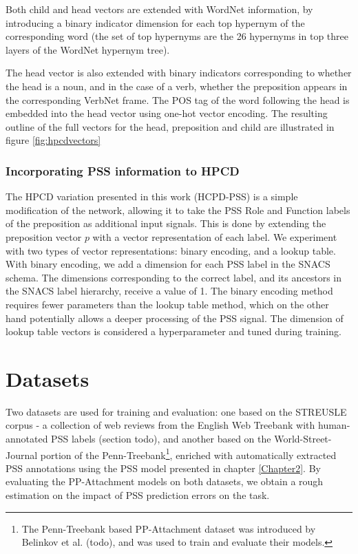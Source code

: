 Both child and head vectors are extended with WordNet information, by introducing a binary indicator dimension for each top hypernym of the corresponding word (the set of top hypernyms are the 26 hypernyms in top three layers of the WordNet hypernym tree). 

The head vector is also extended with binary indicators corresponding to whether the head is a noun, and in the case of a verb, whether the preposition appears in the corresponding VerbNet frame. The POS tag of the word following the head is embedded into the head vector using one-hot vector encoding. The resulting outline of the full vectors for the head, preposition and child are illustrated in figure \ref{fig:hpcdvectors}

\subsubsection{Incorporating PSS information to HPCD}

The HPCD variation presented in this work (HCPD-PSS) is a simple modification of the network, allowing it to take the PSS Role and Function labels of the preposition as additional input signals. This is done by extending the preposition vector $p$ with a vector representation of each label. We experiment with two types of vector representations: binary encoding, and a lookup table. With binary encoding, we add a dimension for each PSS label in the SNACS schema. The dimensions corresponding to the correct label, and its ancestors in the SNACS label hierarchy, receive a value of 1. The binary encoding method requires fewer parameters than the lookup table method, which on the other hand potentially allows a deeper processing of the PSS signal. The dimension of lookup table vectors is considered a hyperparameter and tuned during training.

\section{Datasets}

Two datasets are used for training and evaluation: one based on the STREUSLE corpus - a collection of web reviews from the English Web Treebank with human-annotated PSS labels (section todo), and another based on the World-Street-Journal portion of the Penn-Treebank\footnote{The Penn-Treebank based PP-Attachment dataset was introduced by Belinkov et al. (todo), and was used to train and evaluate their models.}, enriched with automatically extracted PSS annotations using the PSS model presented in chapter \ref{Chapter2}. By evaluating the PP-Attachment models on both datasets, we obtain a rough estimation on the impact of PSS prediction errors on the task.

